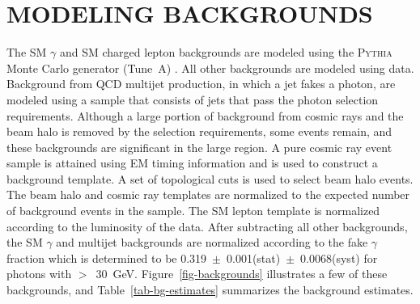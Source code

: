 \documentclass[slac_one]{revtex4}
\begin{document}

\section{MODELING BACKGROUNDS}
The SM $\gamma$ and SM charged lepton backgrounds are modeled using the \textsc{Pythia} Monte Carlo generator (Tune~A) \cite{ref-pythia}.
All other backgrounds are modeled using data. Background from QCD multijet production, in which a jet fakes a photon, are modeled using
a sample that consists of jets that pass the photon selection requirements.  Although a large portion of background from cosmic rays and the
beam halo is removed by the \phojets selection requirements, some events remain, and these backgrounds are significant in the large \met region.
A pure cosmic ray event sample is attained using EM timing information and is used to construct a background template.  A set of topological cuts
is used to select beam halo events. The beam halo and cosmic ray templates are normalized to the expected number of background events
in the \phojets sample. The SM lepton template is normalized according to the luminosity of the data. After subtracting all other backgrounds, the SM
$\gamma$ and multijet backgrounds are normalized according to the fake $\gamma$ fraction which is determined to be \mbox{0.319 $\pm$ 0.001(stat) $\pm$ 0.0068(syst)} for photons with \mbox{\et$>$ 30 GeV}.  Figure~\ref{fig-backgrounds} illustrates a few of these backgrounds, and
Table~\ref{tab-bg-estimates} summarizes the background estimates.
\end{document}
